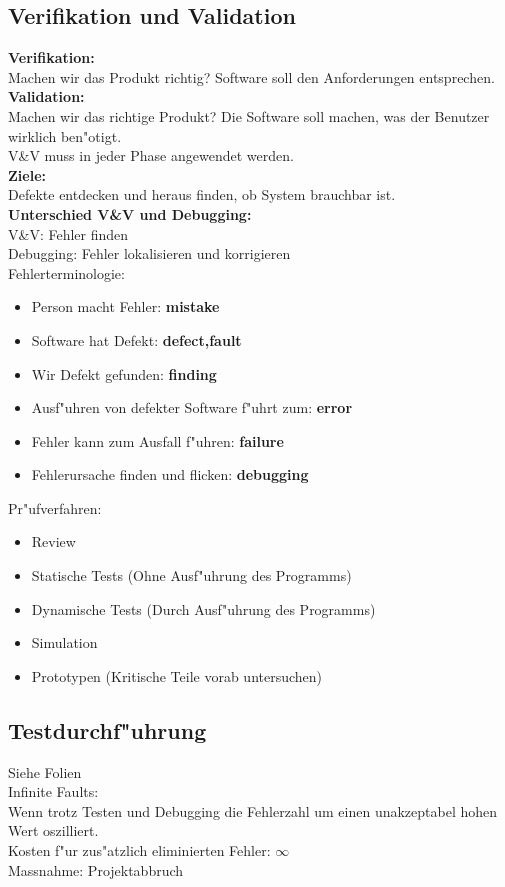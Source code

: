 \subsection{Verifikation und Validation}
\textbf{Verifikation:}\\
Machen wir das Produkt richtig? Software soll den Anforderungen entsprechen.\\
\textbf{Validation:}\\
Machen wir das richtige Produkt? Die Software soll machen, was der Benutzer wirklich ben"otigt.\\
V\&V muss in jeder Phase angewendet werden.\\
\textbf{Ziele:}\\
Defekte entdecken und heraus finden, ob System brauchbar ist.\\
\textbf{Unterschied V\&V und Debugging:}\\
V\&V: Fehler finden\\ 
Debugging: Fehler lokalisieren und korrigieren\\
Fehlerterminologie:\\
\begin{itemize}
\item Person macht Fehler: \textbf{mistake}
\item Software hat Defekt: \textbf{defect,fault}
\item Wir Defekt gefunden: \textbf{finding}
\item Ausf"uhren von defekter Software f"uhrt zum: \textbf{error}
\item Fehler kann zum Ausfall f"uhren: \textbf{failure}
\item Fehlerursache finden und flicken: \textbf{debugging}
\end{itemize}
Pr"ufverfahren:\\
\begin{itemize}
\item Review
\item Statische Tests (Ohne Ausf"uhrung des Programms)
\item Dynamische Tests (Durch Ausf"uhrung des Programms)
\item Simulation
\item Prototypen (Kritische Teile vorab untersuchen)
\end{itemize}

\subsection{Testdurchf"uhrung}
Siehe Folien\\
Infinite Faults:\\
Wenn trotz Testen und Debugging die Fehlerzahl um einen unakzeptabel hohen Wert oszilliert.\\
Kosten f"ur zus"atzlich eliminierten Fehler: $\infty$\\
Massnahme: Projektabbruch

